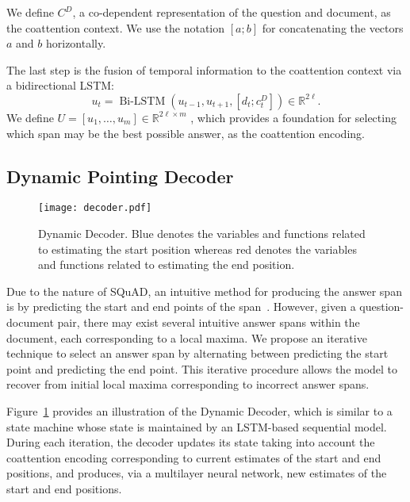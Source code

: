 \documentclass{article} \usepackage{iclr2017_conference,times}
\DeclareMathOperator*{\BiLSTM}{Bi-LSTM}
\newcommand{\squad}{SQuAD\xspace}
\newcommand{\dhid}{\ell}
\newcommand{\doclen}{m}
\newcommand{\real}[1]{\mathbb{R}^{#1}}
\begin{document}
We define $C^D$, a co-dependent representation of the question and document, as the coattention context.
We use the notation $[ a ; b ]$ for concatenating the vectors $a$ and $b$ horizontally.

The last step is the fusion of temporal information to the coattention context via a bidirectional LSTM:
\begin{equation}
u_t = \BiLSTM \left( u_{t-1}, u_{t+1}, \left[ d_t ; c_t^D \right] \right)
\in \real{2 \dhid}.
\end{equation}
We define $U = [u_1, \hdots, u_\doclen]\in \real{2 \dhid \times m}$ , which provides a foundation for selecting which span may be the best possible answer, as the coattention encoding.



\subsection{Dynamic Pointing Decoder}

\begin{figure}[!t]
    \centering
	\texttt{[image: decoder.pdf]}
    \vspace{-0.5cm}
	\caption{Dynamic Decoder. Blue denotes the variables and functions related to estimating the start position whereas red denotes the variables and functions related to estimating the end position.}
	\label{fig:decoder}
\end{figure}

Due to the nature of \squad, an intuitive method for producing the answer span is by predicting the start and end points of the span~\citep{wang2016machine}.
However, given a question-document pair, there may exist several intuitive answer spans within the document, each corresponding to a local maxima.
We propose an iterative technique to select an answer span by alternating between predicting the start point and predicting the end point.
This iterative procedure allows the model to recover from initial local maxima corresponding to incorrect answer spans.

Figure~\ref{fig:decoder} provides an illustration of the Dynamic Decoder, which is similar to a state machine whose state is maintained by an LSTM-based sequential model.
During each iteration, the decoder updates its state taking into account the coattention encoding corresponding to current estimates of the start and end positions, and produces, via a multilayer neural network, new estimates of the start and end positions.
\end{document}
